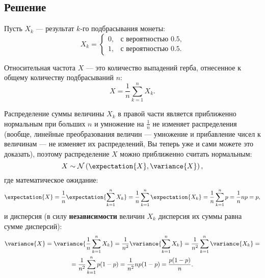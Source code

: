 \documentclass[a4paper,12pt]{article}
\begin{document}
    \subsection*{Решение}
    Пусть $X_k$ --- результат $k$-го подбрасывания монеты:
    \begin{equation}
        X_k =
        \left \{
        \begin{array}{ll}
            0, & \text{с вероятностью 0.5} , \\
            1, & \text{с вероятностью 0.5} .
        \end{array}
        \right .
    \end{equation}

    Относительная частота $X$ --- это количество выпадений герба, отнесенное к общему количеству подбрасываний $n$:
    \begin{equation}
        X = \frac{1}{n} \sum_{k=1}^n X_k .
    \end{equation}

    Распределение суммы величины $X_k$ в правой части является приближенно нормальным при больших $n$ и умножение на $\frac{1}{n}$ не изменяет распределения
    (вообще, линейные преобразования величин --- умножение и прибавление чисел к величинам --- не изменяет их распределений, Вы теперь уже и сами можете это доказать),
    поэтому распределение $X$ можно приближенно считать нормальным:
    \begin{equation}
        X \sim \mathcal{N} \left ( \expectation{X}, \variance{X} \right ) ,
    \end{equation}
    где математическое ожидание:
    \begin{equation}
        \label{1:expectation}
        \expectation{X}
        = \frac{1}{n} \expectation{\sum_{k=1}^n X_k}
        = \frac{1}{n} \sum_{k=1}^n \expectation{X_k}
        = \frac{1}{n} \sum_{k=1}^n p
        = \frac{1}{n} n p = p ,
    \end{equation}
    и дисперсия (в силу \textbf{независимости} величин $X_k$ дисперсия их суммы равна сумме дисперсий):
    \begin{multline}
        \label{1:variance}
        \variance{X}
        = \variance{\frac{1}{n} \sum_{k=1}^n X_k}
        = \frac{1}{n^2} \variance{\sum_{k=1}^n X_k}
        = \frac{1}{n^2} \sum_{k=1}^n \variance{X_k} = \\
        = \frac{1}{n^2} \sum_{k=1}^n p(1-p)
        = \frac{1}{n^2} n p(1-p)
        = \frac{p(1-p)}{n} .
    \end{multline}
\end{document}
